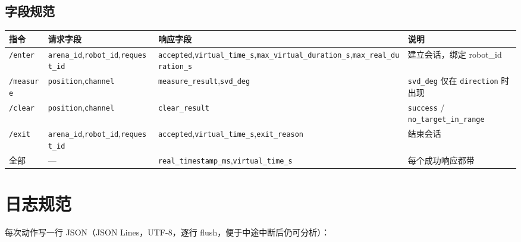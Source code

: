 \subsection{字段规范}

\begin{longtable}{p{2.1cm}p{2.6cm}p{3.4cm}p{6.2cm}}
\toprule
指令 & 请求字段 & 响应字段 & 说明 \\ \midrule
\endhead
\texttt{/enter} & \texttt{arena\_id},\newline\texttt{robot\_id},\newline\texttt{request\_id} &
\texttt{accepted},\newline\texttt{virtual\_time\_s},\newline\texttt{max\_virtual\_\hspace{0pt}duration\_s},\newline\texttt{max\_real\_\hspace{0pt}duration\_s} &
建立会话，绑定 robot\_id \\
\texttt{/measure} & \texttt{position},\newline\texttt{channel} &
\texttt{measure\_result},\newline\texttt{svd\_deg} & \texttt{svd\_deg} 仅在 \texttt{direction} 时出现 \\
\texttt{/clear} & \texttt{position},\newline\texttt{channel} &
\texttt{clear\_result} & \texttt{success} / \texttt{no\_target\_in\_range} \\
\texttt{/exit} & \texttt{arena\_id},\newline\texttt{robot\_id},\newline\texttt{request\_id} &
\texttt{accepted},\newline\texttt{virtual\_time\_s},\newline\texttt{exit\_reason} & 结束会话 \\
全部 & --- & \texttt{real\_timestamp\_\hspace{0pt}ms},\newline\texttt{virtual\_time\_s} & 每个成功响应都带 \\
\bottomrule
\end{longtable}

\section{日志规范}

每次动作写一行 JSON（JSON Lines，UTF-8，逐行 flush，便于中途中断后仍可分析）：

